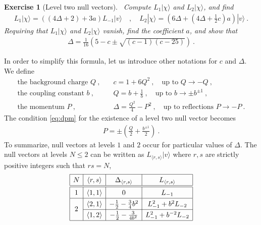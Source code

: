 \documentclass[12pt, a4paper]{article}
\theoremstyle{break}
\newtheorem{exo}{Exercise}[section]
\begin{document}
\begin{exo}[Level two null vectors]
 ~\label{exo:level2}
 Compute  $L_1|\chi\rangle$ and $L_2|\chi\rangle$, and find 
 \begin{align}
  L_1 |\chi\rangle = \left((4\Delta+2) + 3a\right) L_{-1}|v\rangle
  \quad , \quad L_2 |\chi\rangle= \left(6\Delta + (4\Delta +\tfrac12 c)a\right) |v\rangle\ .
 \end{align}
 Requiring that $L_1|\chi\rangle$ and $L_2|\chi\rangle$ vanish, find the coefficient $a$, and show that
 \begin{align}
 \Delta = \frac{1}{16}\left( 5-c\pm\sqrt{(c-1)(c-25)} \right) \ .
 \label{eq:dpm}
\end{align}
\end{exo}
In order to simplify this formula, let us introduce other notations for $c$ and $\Delta$. We define
\begin{align}
 \text{the background charge } Q \ , & \quad c = 1+6Q^2\ , \quad \text{up to } Q \to -Q\ ,
 \label{eq:cqb}
 \\
 \text{the coupling constant } b \ , & \quad Q = b+\frac{1}{b} \ , \quad \text{up to } b\to \pm b^{\pm 1}\ ,
 \\
 \text{the momentum } P\  , &\quad \Delta = \frac{Q^2}{4}-P^2\ , \quad \text{up to reflections } P \to -P\ .
\label{eq:refm}
 \end{align}
The condition \eqref{eq:dpm} for the existence of a level two null vector becomes 
\begin{align}
 P = \pm \left(\frac{Q}{2} + \frac{b^{\pm 1}}{2}\right)\ .
\end{align}
To summarize, null vectors at levels $1$ and $2$ occur for particular values of $\Delta$. The null vectors at levels $N\leq 2$ can be written as $L_{\langle r,s\rangle}|v\rangle$ where $r,s$ are strictly positive integers such that $rs=N$,
\begin{align}
\renewcommand{\arraystretch}{1.3}
\begin{array}{|c|c|c|c|}
\hline 
N & \langle r,s\rangle & \Delta_{\langle r,s\rangle} &  L_{\langle r,s\rangle} 
\\
\hline\hline
1 & \langle 1,1\rangle & 0 &  L_{-1}
\\
\hline
\multirow{2}{*}{2} & 
\langle 2,1\rangle & -\frac12 -\frac{3}{4} b^2  & L_{-1}^2 + b^2 L_{-2}
\\
\cline{2-4}
& \langle 1,2\rangle & -\frac12 - \frac{3}{4b^2} & L_{-1}^2 + b^{-2} L_{-2} 
\\
\hline
\end{array}
\label{lot}
\end{align}
\end{document}
